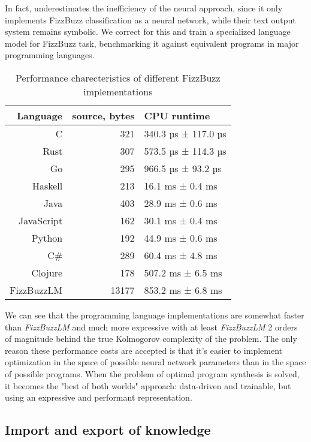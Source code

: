 In fact, \cite{JoelGrusFizz} underestimates the inefficiency of the neural approach, since it only implements FizzBuzz \cite{reesFizzBuzz1012002} classification as a neural network, while their text output system remains symbolic.
We correct for this and train a specialized language model for FizzBuzz task, benchmarking it against equivalent programs in major programming languages.

\begin{table}[H]
    \centering
    \begin{tabular}{r|r|l}
         Language & source, bytes & CPU runtime \\
         \midrule
         C & 321 & 340.3 µs ± 117.0 µs \\
         Rust & 307 & 573.5 µs ± 114.3 µs \\
         Go & 295 & 966.5 µs ±  93.2 µs \\
         Haskell & 213 & 16.1 ms ± 0.4 ms \\
         Java & 403 & 28.9 ms ± 0.6 ms \\
         JavaScript & 162 & 30.1 ms ± 0.4 ms \\
         Python & 192 & 44.9 ms ± 0.6 ms \\
         C\# & 289 & 60.4 ms ± 4.8 ms \\
         Clojure & 178 & 507.2 ms ± 6.5 ms \\
         FizzBuzzLM & 13177 & 853.2 ms ± 6.8 ms
    \end{tabular}
    \caption{Performance charecteristics of different FizzBuzz implementations}
    \label{tab:my_label}
\end{table}

We can see that the programming language implementations are somewhat faster than \emph{FizzBuzzLM} and much more expressive with at least \emph{FizzBuzzLM} 2 orders of magnitude behind the true Kolmogorov complexity \cite{kolmogorov} of the problem.
The only reason these performance costs are accepted is that it's easier to implement optimization in the space of possible neural network parameters than in the space of possible programs. 
When the problem of optimal program synthesis is solved, it becomes the "best of both worlds" approach: data-driven and trainable, but using an expressive and performant representation.
 
\subsection{Import and export of knowledge}
\label{sec:importexport}

